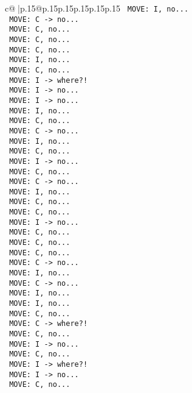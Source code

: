 \documentclass{article}
\begin{document}
{\begin{supertabular}{c@{$\;$}|p{.15\linewidth}@{}p{.15\linewidth}p{.15\linewidth}p{.15\linewidth}p{.15\linewidth}p{.15\linewidth}}
{{{\texttt{ MOVE: I, no...} \\
\texttt{ MOVE: C {-}> no...} \\
\texttt{ MOVE: C, no...} \\
\texttt{ MOVE: C, no...} \\
\texttt{ MOVE: C, no...} \\
\texttt{ MOVE: I, no...} \\
\texttt{ MOVE: C, no...} \\
\texttt{ MOVE: I {-}> where?!} \\
\texttt{ MOVE: I {-}> no...} \\
\texttt{ MOVE: I {-}> no...} \\
\texttt{ MOVE: I, no...} \\
\texttt{ MOVE: C, no...} \\
\texttt{ MOVE: C {-}> no...} \\
\texttt{ MOVE: I, no...} \\
\texttt{ MOVE: C, no...} \\
\texttt{ MOVE: I {-}> no...} \\
\texttt{ MOVE: C, no...} \\
\texttt{ MOVE: C {-}> no...} \\
\texttt{ MOVE: I, no...} \\
\texttt{ MOVE: C, no...} \\
\texttt{ MOVE: C, no...} \\
\texttt{ MOVE: I {-}> no...} \\
\texttt{ MOVE: C, no...} \\
\texttt{ MOVE: C, no...} \\
\texttt{ MOVE: C, no...} \\
\texttt{ MOVE: C {-}> no...} \\
\texttt{ MOVE: I, no...} \\
\texttt{ MOVE: C {-}> no...} \\
\texttt{ MOVE: I, no...} \\
\texttt{ MOVE: I, no...} \\
\texttt{ MOVE: C, no...} \\
\texttt{ MOVE: C {-}> where?!} \\
\texttt{ MOVE: C, no...} \\
\texttt{ MOVE: I {-}> no...} \\
\texttt{ MOVE: C, no...} \\
\texttt{ MOVE: I {-}> where?!} \\
\texttt{ MOVE: I {-}> no...} \\
\texttt{ MOVE: C, no...} \\
}}}
\end{supertabular}}
\end{document}
